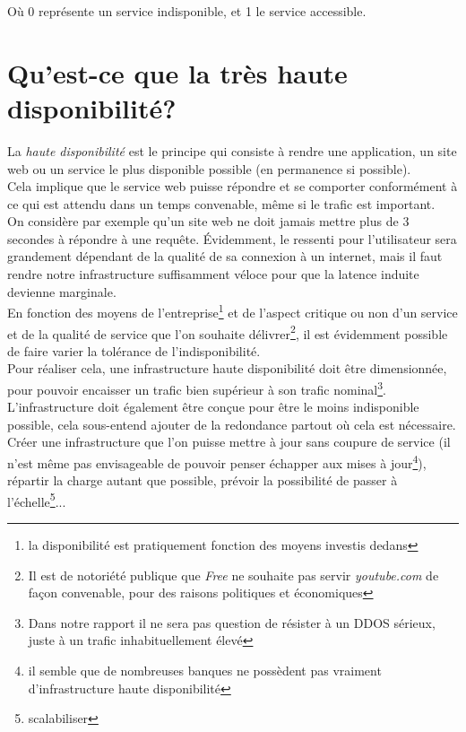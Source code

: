 \documentclass[a4paper,10pt,one side,titlepage]{report}
\begin{document}
Où 0 représente un service indisponible, et 1 le service accessible.

\section{Qu'est-ce que la très haute disponibilité?}
La \emph{haute disponibilité} est le principe qui consiste à rendre une 
application, un site web ou un service le plus disponible possible (en permanence 
si possible).\\

Cela implique que le service web puisse répondre et se comporter conformément à 
ce qui est attendu dans un temps convenable, même si le trafic est important.\\ 

On considère par exemple qu'un site web ne doit jamais mettre plus de 3 secondes 
à répondre à une requête. Évidemment, le ressenti pour l'utilisateur sera 
grandement dépendant de la qualité de sa connexion à un internet, mais il faut 
rendre notre infrastructure suffisamment véloce pour que la latence induite 
devienne marginale. \\

En fonction des moyens de l'entreprise\footnote{la disponibilité est pratiquement 
fonction des moyens investis dedans} et de l'aspect critique ou non d'un service 
et de la qualité de service que l'on souhaite délivrer\footnote{Il est de 
notoriété publique que \emph{Free} ne souhaite pas servir \emph{youtube.com} de 
façon convenable, pour des raisons politiques et économiques}, il est évidemment 
possible de faire varier la tolérance de l'indisponibilité. \\

Pour réaliser cela, une infrastructure haute disponibilité doit être dimensionnée, 
pour pouvoir encaisser un trafic bien supérieur à son trafic nominal\footnote{Dans 
notre rapport il ne sera pas question de résister à un \gls{DDOS} sérieux, juste 
à un trafic inhabituellement élevé}.\\ %

L'infrastructure doit également être conçue pour être le moins indisponible possible, 
cela sous-entend ajouter de la redondance partout où cela est nécessaire. Créer 
une infrastructure que l'on puisse mettre à jour sans coupure de service (il n'est 
même pas envisageable de pouvoir penser échapper aux mises à jour\footnote{il 
semble que de nombreuses banques ne possèdent pas vraiment d'infrastructure haute 
disponibilité}), répartir la charge autant que possible, prévoir la possibilité de 
passer à l'échelle\footnote{\gls{scalabiliser}}...\\
\end{document}

